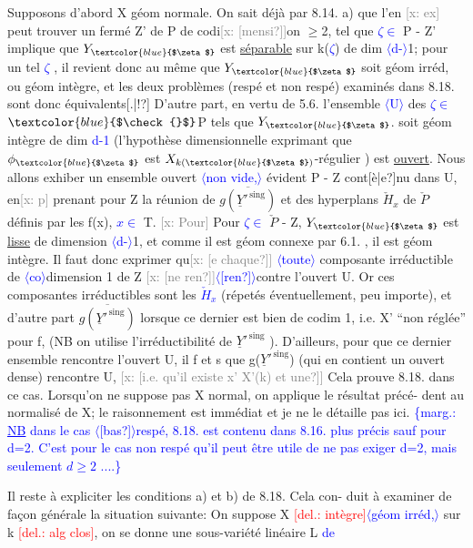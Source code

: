 \documentclass[11pt]{article}
\newcommand{\hand}[1]{\textcolor{blue}{#1}}
\newcommand{\inserted}[2][]{\textcolor{blue}{$\langle$#2$\rangle$}}
\newcommand{\margin}[1]{\textcolor{blue}{\{\textsf{marg.:} #1\}}}
\newcommand{\deleted}[1]{\textcolor{red}{[\textsf{del.:} #1]}}
\newcommand{\xout}[1]{\textcolor{gray}{[\textsf{x:} #1]}}
\newcommand{\uline}[1]{\underline{#1}}
\newcommand{\unsure}[1]{[#1?]}
\begin{document}
Supposons d'abord X géom normale. On sait déjà par 8.14. a)  que
l'en \xout{ex} peut trouver un fermé Z' de P de codi\xout{\unsure{mensi}}on $\geq$2, tel que
\hand{$\zeta\in$} P - Z'  implique que  $Y_{\hand{$\zeta$}}$  est  \uline{séparable} sur k(\hand{$\zeta$}) de  dim \inserted{d-}1; pour
un tel \hand{$\zeta$} , il revient donc au même que $Y_{\hand{$\zeta$}}$ soit géom irréd, ou géom
intègre, et  les deux problèmes  (respé et non respé) examinés dans
8.18. sont donc équivalents\unsure{.|!} D'autre part, en vertu de 5.6. l'ensemble
\inserted{U} des \hand{$\zeta\in$} $\hand{$\check{}$}$P  tels que  $Y_{\hand{$\zeta$}}$.  soit géom intègre de dim \hand{d-1} (l'hypothèse
dimensionnelle exprimant que $\phi_{\hand{$\zeta$}}$ est $X_{k(\hand{$\zeta$})}$-régulier ) est \uline{ouvert}.
Nous allons exhiber un ensemble ouvert \inserted[typed]{non vide,} évident  P - Z  cont\unsure{è|e}nu dans U,
en\xout{p} prenant pour  Z la réunion de  $\overline{g(\underline{Y}'^{\,\mathrm{sing}})}$  et des hyperplans $\check{H}_x$
de $\check{P}$  définis par les  f(x), \hand{$x\in$} T. \xout{Pour} Pour \hand{$\zeta\in$} $\check{P}$ - Z,  $Y_{\hand{$\zeta$}}$  est \uline{lisse}
de dimension \inserted{d-}1, et comme il est géom connexe par 6.1. , il est géom
intègre.  Il faut donc  exprimer qu\xout{\unsure{e chaque}} \inserted[typed]{toute} composante irréductible
de \inserted[typed]{co}dimension  1 de Z  \xout{\unsure{ne ren}}\inserted{\unsure{ren}}contre l'ouvert U.  Or ces composantes
irréductibles sont les  \hand{$\check{H}_x$}  (répetés éventuellement, peu importe), et
d'autre part $\overline{g(\underline{Y}'^{\,\mathrm{sing}})}$  lorsque  ce dernier  est bien de codim 1, i.e.
X' ``non réglée'' pour f, (NB on utilise l'irréductibilité de  $\underline{Y}'^{\,\mathrm{sing}}$ ).
D'ailleurs, pour que ce dernier ensemble rencontre  l'ouvert U,
il f et s  que  g($\underline{Y}'^{\,\mathrm{sing}}$)  (qui en contient un ouvert dense) rencontre
U, \xout{\unsure{i.e. qu'il existe x' X'(k) et une}} Cela prouve 8.18. dans ce
cas.  Lorsqu'on ne suppose pas X normal, on applique le résultat précé-%
dent au normalisé de X; le raisonnement est immédiat et je ne le détaille
pas ici.  \margin{\uline{NB} dans le cas \inserted{\unsure{bas}}respé, 8.18. est contenu dans 8.16. plus précis sauf pour d=2. C'est pour le cas non respé qu'il peut être utile de ne pas exiger d=2, mais seulement $d\geq 2$ ....}

Il reste à expliciter  les conditions a) et b) de 8.18. Cela con-%
duit à examiner de façon générale la situation suivante:  On suppose
X \deleted{intègre}\inserted{géom irréd,} sur k \deleted{alg clos}, on se donne une sous-variété linéaire  L \hand{de}
\end{document}
